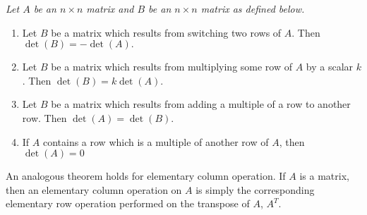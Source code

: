 \documentclass[pdf
]{beamer}
\begin{document}
{{%
%
\begin{theorem}\em
Let $A$ be an $n\times n$ matrix and $B$ be an $n \times n$ matrix as defined below.
\pause
\begin{enumerate}
\item Let $B$ be a matrix
which results from switching two rows of $A.$ Then $\det \left( B\right)
= - \det \left( A\right) .$ 

\item Let $B$ be a matrix
which results from multiplying some row of $A$ by a scalar $k$. Then $\det
\left( B\right) = k \det \left( A\right). $

\item
Let $B$ be a matrix
which results from adding a multiple of a row to another row.
 Then $\det \left( A\right) =\det
\left( B \right) $.

\item
If $A$ contains a row which is a multiple of another row of $A$, then $\det \left( A \right) = 0$
\end{enumerate}
\end{theorem}
\pause
\begin{alertblock}{}
An analogous theorem holds for \alert{elementary column operation}.
If $A$ is a matrix, then an 
\alert{elementary column operation}
on $A$ is simply the corresponding elementary row operation
performed on the transpose of $A$, $A^T$.
\end{alertblock}
}

}
\end{document}

